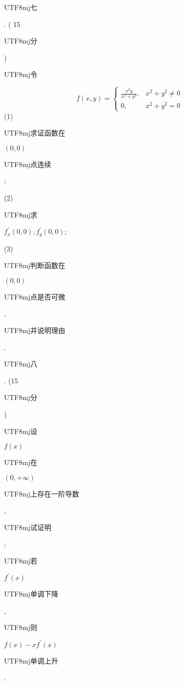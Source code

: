 \documentclass[10pt]{article}
\begin{document}
\begin{CJK}{UTF8}{mj}七\end{CJK}. ( 15 \begin{CJK}{UTF8}{mj}分\end{CJK}) \begin{CJK}{UTF8}{mj}令\end{CJK}
$$
f(x, y)= \begin{cases}\frac{x^{2} y}{x^{2}+y^{2}}, & x^{2}+y^{2} \neq 0 \\ 0, & x^{2}+y^{2}=0\end{cases}
$$
(1) \begin{CJK}{UTF8}{mj}求证函数在\end{CJK} $(0,0)$ \begin{CJK}{UTF8}{mj}点连续\end{CJK};

(2) \begin{CJK}{UTF8}{mj}求\end{CJK} $f_{x}^{\prime}(0,0), f_{y}^{\prime}(0,0)$;

(3) \begin{CJK}{UTF8}{mj}判断函数在\end{CJK} $(0,0)$ \begin{CJK}{UTF8}{mj}点是否可微\end{CJK}, \begin{CJK}{UTF8}{mj}并说明理由\end{CJK}.

\begin{CJK}{UTF8}{mj}八\end{CJK}. (15\begin{CJK}{UTF8}{mj}分\end{CJK}) \begin{CJK}{UTF8}{mj}设\end{CJK} $f(x)$ \begin{CJK}{UTF8}{mj}在\end{CJK} $(0,+\infty)$ \begin{CJK}{UTF8}{mj}上存在一阶导数\end{CJK}, \begin{CJK}{UTF8}{mj}试证明\end{CJK}: \begin{CJK}{UTF8}{mj}若\end{CJK} $f^{\prime}(x)$ \begin{CJK}{UTF8}{mj}单调下降\end{CJK}, \begin{CJK}{UTF8}{mj}则\end{CJK} $f(x)-x f^{\prime}(x)$ \begin{CJK}{UTF8}{mj}单调上升\end{CJK}.
\end{document}
